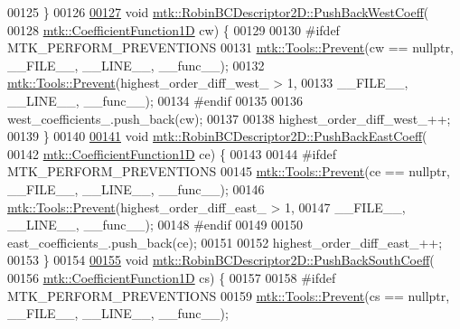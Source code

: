 \begin{DoxyCode}
00125 \}
00126 
\hypertarget{mtk__robin__bc__descriptor__2d_8cc_source_l00127}{}\hyperlink{classmtk_1_1RobinBCDescriptor2D_a671a38d5ea78be8f0a88ccf034d09987}{00127} \textcolor{keywordtype}{void} \hyperlink{classmtk_1_1RobinBCDescriptor2D_a671a38d5ea78be8f0a88ccf034d09987}{mtk::RobinBCDescriptor2D::PushBackWestCoeff}(
00128     \hyperlink{group__c07-mim__ops_gaa79593eeb6676d6011db339e01983909}{mtk::CoefficientFunction1D} cw) \{
00129 
00130 \textcolor{preprocessor}{  #ifdef MTK\_PERFORM\_PREVENTIONS}
00131   \hyperlink{classmtk_1_1Tools_a332324c6f25e66be9dff48c5987a3b9f}{mtk::Tools::Prevent}(cw == \textcolor{keyword}{nullptr}, \_\_FILE\_\_, \_\_LINE\_\_, \_\_func\_\_);
00132   \hyperlink{classmtk_1_1Tools_a332324c6f25e66be9dff48c5987a3b9f}{mtk::Tools::Prevent}(highest\_order\_diff\_west\_ > 1,
00133                       \_\_FILE\_\_, \_\_LINE\_\_, \_\_func\_\_);
00134 \textcolor{preprocessor}{  #endif}
00135 
00136   west\_coefficients\_.push\_back(cw);
00137 
00138   highest\_order\_diff\_west\_++;
00139 \}
00140 
\hypertarget{mtk__robin__bc__descriptor__2d_8cc_source_l00141}{}\hyperlink{classmtk_1_1RobinBCDescriptor2D_a7cc1e6ca729b8b092eb73161eb244160}{00141} \textcolor{keywordtype}{void} \hyperlink{classmtk_1_1RobinBCDescriptor2D_a7cc1e6ca729b8b092eb73161eb244160}{mtk::RobinBCDescriptor2D::PushBackEastCoeff}(
00142     \hyperlink{group__c07-mim__ops_gaa79593eeb6676d6011db339e01983909}{mtk::CoefficientFunction1D} ce) \{
00143 
00144 \textcolor{preprocessor}{  #ifdef MTK\_PERFORM\_PREVENTIONS}
00145   \hyperlink{classmtk_1_1Tools_a332324c6f25e66be9dff48c5987a3b9f}{mtk::Tools::Prevent}(ce == \textcolor{keyword}{nullptr}, \_\_FILE\_\_, \_\_LINE\_\_, \_\_func\_\_);
00146   \hyperlink{classmtk_1_1Tools_a332324c6f25e66be9dff48c5987a3b9f}{mtk::Tools::Prevent}(highest\_order\_diff\_east\_ > 1,
00147                       \_\_FILE\_\_, \_\_LINE\_\_, \_\_func\_\_);
00148 \textcolor{preprocessor}{  #endif}
00149 
00150   east\_coefficients\_.push\_back(ce);
00151 
00152   highest\_order\_diff\_east\_++;
00153 \}
00154 
\hypertarget{mtk__robin__bc__descriptor__2d_8cc_source_l00155}{}\hyperlink{classmtk_1_1RobinBCDescriptor2D_ad74c5d9f2c1d0359d350348ac2a7e61e}{00155} \textcolor{keywordtype}{void} \hyperlink{classmtk_1_1RobinBCDescriptor2D_ad74c5d9f2c1d0359d350348ac2a7e61e}{mtk::RobinBCDescriptor2D::PushBackSouthCoeff}(
00156     \hyperlink{group__c07-mim__ops_gaa79593eeb6676d6011db339e01983909}{mtk::CoefficientFunction1D} cs) \{
00157 
00158 \textcolor{preprocessor}{  #ifdef MTK\_PERFORM\_PREVENTIONS}
00159   \hyperlink{classmtk_1_1Tools_a332324c6f25e66be9dff48c5987a3b9f}{mtk::Tools::Prevent}(cs == \textcolor{keyword}{nullptr}, \_\_FILE\_\_, \_\_LINE\_\_, \_\_func\_\_);

\end{DoxyCode}
